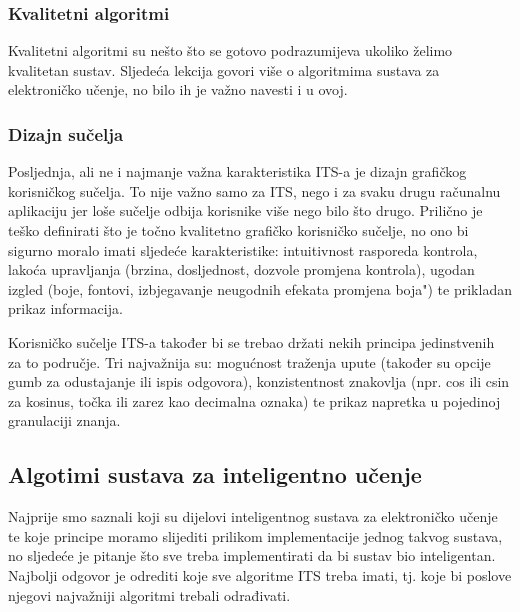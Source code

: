 \documentclass[times, utf8, zavrsni, numeric]{fer}
\begin{document}
\subsubsection{Kvalitetni algoritmi}
Kvalitetni algoritmi su nešto što se gotovo podrazumijeva ukoliko želimo kvalitetan sustav. Sljedeća lekcija govori više o algoritmima sustava za elektroničko učenje, no bilo ih je važno navesti i u ovoj.

\subsubsection{Dizajn sučelja}
Posljednja, ali ne i najmanje važna karakteristika ITS-a je dizajn grafičkog korisničkog sučelja. To nije važno samo za ITS, nego i za svaku drugu računalnu aplikaciju jer loše sučelje odbija korisnike više nego bilo što drugo. Prilično je teško definirati što je točno kvalitetno grafičko korisničko sučelje, no ono bi sigurno moralo imati sljedeće karakteristike: intuitivnost rasporeda kontrola, lakoća upravljanja (brzina, dosljednost, dozvole promjena kontrola), ugodan izgled (boje, fontovi, izbjegavanje neugodnih efekata promjena boja") te prikladan prikaz informacija.
\par
Korisničko sučelje ITS-a također bi se trebao držati nekih principa jedinstvenih za to područje. Tri najvažnija su: mogućnost traženja upute (također su opcije gumb za odustajanje ili ispis odgovora), konzistentnost znakovlja (npr. cos ili csin za kosinus, točka ili zarez kao decimalna oznaka) te prikaz napretka u pojedinoj granulaciji znanja.\cite{interface}

\subsection{Algotimi sustava za inteligentno učenje}

Najprije smo saznali koji su dijelovi inteligentnog sustava za elektroničko učenje te koje principe moramo slijediti prilikom implementacije jednog takvog sustava, no sljedeće je pitanje što sve treba implementirati da bi sustav bio inteligentan. Najbolji odgovor je odrediti koje sve algoritme ITS treba imati, tj. koje bi poslove njegovi najvažniji algoritmi trebali odrađivati.
\end{document}
